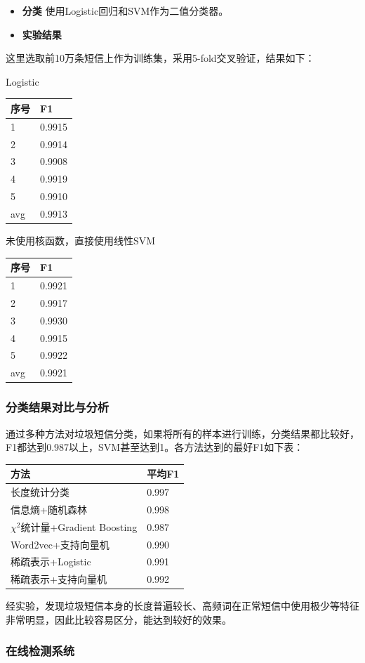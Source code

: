 \documentclass{article}
\begin{document}
\begin{itemize}
\item
  \textbf{分类} 使用Logistic回归和SVM作为二值分类器。
\item
  \textbf{实验结果}
\end{itemize}

这里选取前10万条短信上作为训练集，采用5-fold交叉验证，结果如下：

Logistic

\begin{longtable}[]{@{}ll@{}}
\toprule
序号 & F1\tabularnewline
\midrule
\endhead
1 & 0.9915\tabularnewline
2 & 0.9914\tabularnewline
3 & 0.9908\tabularnewline
4 & 0.9919\tabularnewline
5 & 0.9910\tabularnewline
avg & 0.9913\tabularnewline
\bottomrule
\end{longtable}

未使用核函数，直接使用线性SVM

\begin{longtable}[]{@{}ll@{}}
\toprule
序号 & F1\tabularnewline
\midrule
\endhead
1 & 0.9921\tabularnewline
2 & 0.9917\tabularnewline
3 & 0.9930\tabularnewline
4 & 0.9915\tabularnewline
5 & 0.9922\tabularnewline
avg & 0.9921\tabularnewline
\bottomrule
\end{longtable}

\subsubsection{分类结果对比与分析}\label{ux5206ux7c7bux7ed3ux679cux5bf9ux6bd4ux4e0eux5206ux6790}

通过多种方法对垃圾短信分类，如果将所有的样本进行训练，分类结果都比较好，F1都达到0.987以上，SVM甚至达到1。各方法达到的最好F1如下表：

\begin{longtable}[]{@{}ll@{}}
\toprule
方法 & 平均F1\tabularnewline
\midrule
\endhead
长度统计分类 & 0.997\tabularnewline
信息熵+随机森林 & 0.998\tabularnewline
\(\chi^2\)统计量+Gradient Boosting & 0.987\tabularnewline
Word2vec+支持向量机 & 0.990\tabularnewline
稀疏表示+Logistic & 0.991\tabularnewline
稀疏表示+支持向量机 & 0.992\tabularnewline
\bottomrule
\end{longtable}

经实验，发现垃圾短信本身的长度普遍较长、高频词在正常短信中使用极少等特征非常明显，因此比较容易区分，能达到较好的效果。

\subsubsection{在线检测系统}\label{ux5728ux7ebfux68c0ux6d4bux7cfbux7edf}
\end{document}
